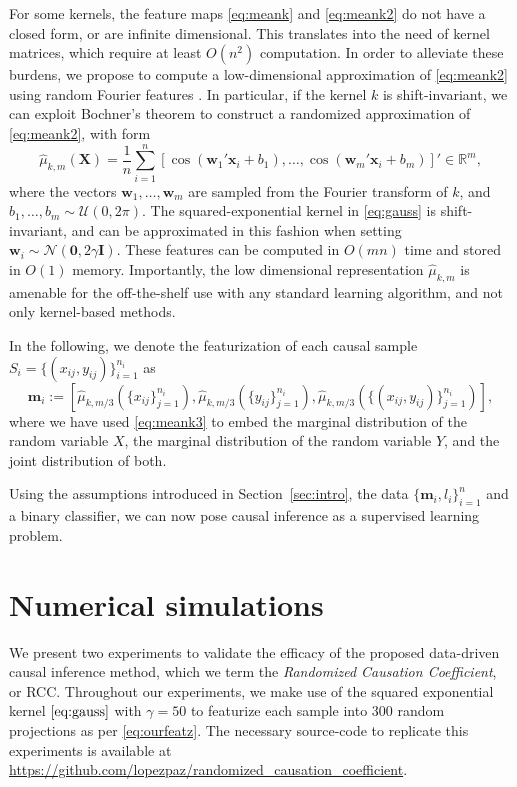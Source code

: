 \documentclass[twoside,11pt,a4paper]{article}
\begin{document}
For some kernels, the feature maps \eqref{eq:meank} and \eqref{eq:meank2} do
not have a closed form, or are infinite dimensional. This translates into the
need of kernel matrices, which require at least $O(n^2)$ computation. In order
to alleviate these burdens, we propose to compute a low-dimensional
approximation of \eqref{eq:meank2} using random Fourier features
\citep{Rahimi07}. In particular, if the kernel $k$ is shift-invariant, we can
exploit Bochner's theorem \citep{Rudin62} to construct a randomized
approximation of \eqref{eq:meank2}, with form
\begin{equation}\label{eq:meank3}
  \hat{\mu}_{k,m}(\bm X) = \frac{1}{n} \sum_{i=1}^n \left[ \cos(\bm w_1' \bm
  x_i + b_1), \ldots, \cos(\bm w_m' \bm x_i + b_m)\right]' \in
  \mathbb{R}^m,
\end{equation}
where the vectors $\bm w_1, \ldots, \bm w_m$ are sampled from the Fourier
transform of $k$, and $b_1, \ldots, b_m \sim \mathcal{U}(0, 2\pi)$. The
squared-exponential kernel in \eqref{eq:gauss} is shift-invariant, and can be
approximated in this fashion when setting $\bm w_i \sim \mathcal{N}(\bm 0,
2\gamma \bm I)$.  These features can be computed in $O(mn)$ time and stored in
$O(1)$ memory. Importantly, the low dimensional representation
$\hat{\mu}_{k,m}$ is amenable for the off-the-shelf use with any standard
learning algorithm, and not only kernel-based methods.

In the following, we denote the featurization of each causal sample $S_i =
\{(x_{ij},y_{ij})\}_{i=1}^{n_i}$ as 
\begin{equation}
  \label{eq:ourfeatz}
  \bm m_i :=
  \left[
  \hat{\mu}_{k,m/3}\left(\{x_{ij}\}_{j=1}^{n_i}\right),
  \hat{\mu}_{k,m/3}\left(\{y_{ij}\}_{j=1}^{n_i}\right),
  \hat{\mu}_{k,m/3}\left(\{(x_{ij},y_{ij})\}_{j=1}^{n_i}\right)
  \right],
\end{equation}
where we have used \eqref{eq:meank3} to embed the marginal distribution of the
random variable $X$, the marginal distribution of the random variable $Y$, and
the joint distribution of both.

Using the assumptions introduced in Section~\ref{sec:intro}, the data $\{\bm
m_i,l_i\}_{i=1}^n$ and a binary classifier, we can now pose causal inference as
a supervised learning problem.

\section{Numerical simulations}\label{sec:exps}
We present two experiments to validate the efficacy of the proposed data-driven
causal inference method, which we term the \emph{Randomized Causation
Coefficient}, or RCC. Throughout our experiments, we make use of the squared
exponential kernel $\eqref{eq:gauss}$ with $\gamma = 50$ to featurize each
sample into $300$ random projections as per \eqref{eq:ourfeatz}. The necessary
source-code to replicate this experiments is available at
\url{https://github.com/lopezpaz/randomized_causation_coefficient}.
\end{document}
